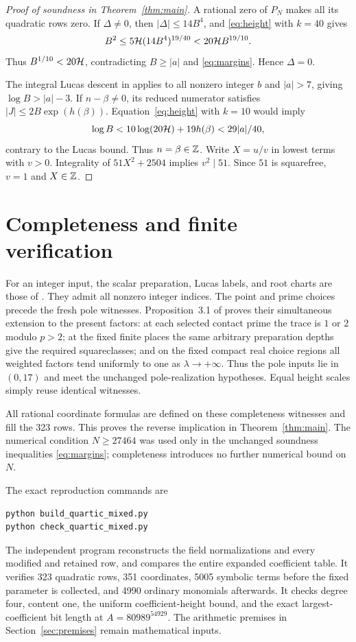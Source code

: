 \documentclass[11pt,a4paper]{article}
\theoremstyle{remark}\newtheorem{remark}[theorem]{Remark}
\begin{document}
\begin{proof}[Proof of soundness in Theorem~\ref{thm:main}]
A rational zero of $P_N$ makes all its quadratic rows zero.
If $\Delta\ne0$, then $|\Delta|\le14B^4$, and \eqref{eq:height}
with $k=40$ gives
\[
 B^2\le5\mathcal H(14B^4)^{19/40}<20\mathcal H B^{19/10}.
\]
Thus $B^{1/10}<20\mathcal H$, contradicting $B\ge|a|$ and
\eqref{eq:margins}. Hence $\Delta=0$.

The integral Lucas descent in \cite[Section~5]{Source} applies to all
nonzero integer $b$ and $|a|>7$, giving $\log B>|a|-3$.
If $n-\beta\ne0$, its reduced numerator satisfies
$|J|\le2B\exp(h(\beta))$. Equation~\eqref{eq:height} with $k=10$
would imply
\[
 \log B<10\log(20\mathcal H)+19h(\beta)<29|a|/40,
\]
contrary to the Lucas bound. Thus $n=\beta\in\mathbb Z$. Write $X=u/v$
in lowest terms with $v>0$. Integrality of $51X^2+2504$ implies
$v^2\mid51$. Since $51$ is squarefree, $v=1$ and $X\in\mathbb Z$.
\end{proof}

\section{Completeness and finite verification}
For an integer input, the scalar preparation, Lucas labels, and root
charts are those of \cite{Baseline}. They admit all nonzero integer
indices. The point and prime choices precede the fresh pole witnesses.
Proposition~3.1 of \cite{Packing} proves their simultaneous extension
to the present factors: at each selected contact prime the trace is
$1$ or $2$ modulo $p>2$; at the fixed finite places the same arbitrary
preparation depths give the required squareclasses; and on the fixed
compact real choice regions all weighted factors tend uniformly to one
as $\lambda\to+\infty$. Thus the pole inputs lie in $(0,17)$ and meet
the unchanged pole-realization hypotheses. Equal height scales simply
reuse identical witnesses.

All rational coordinate formulas are defined on these completeness
witnesses and fill the 323 rows. This proves the reverse implication
in Theorem~\ref{thm:main}. The numerical condition $N\ge27464$ was used
only in the unchanged soundness inequalities \eqref{eq:margins};
completeness introduces no further numerical bound on $N$.

The exact reproduction commands are
\begin{verbatim}
python build_quartic_mixed.py
python check_quartic_mixed.py
\end{verbatim}
The independent program reconstructs the field normalizations and every
modified and retained row, and compares the entire expanded coefficient
table. It verifies 323 quadratic rows, 351 coordinates, 5005 symbolic
terms before the fixed parameter is collected, and 4990 ordinary
monomials afterwards. It checks degree four, content one, the uniform
coefficient-height bound, and the exact largest-coefficient bit length
at $A=80989^{54929}$. The arithmetic premises in
Section~\ref{sec:premises} remain mathematical inputs.
\end{document}
